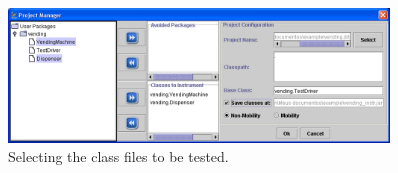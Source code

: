\begin{figure}[!ht]
\begin{center}
\includegraphics[width=0.90\textwidth]{fig/project-manager.eps}
\caption{\label{fig:project-manager}Selecting the class files to
be tested.}
\end{center}
\end{figure}
